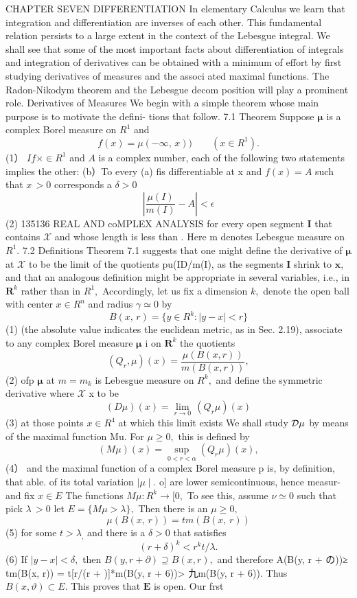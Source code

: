 CHAPTER SEVEN DIFFERENTIATION In elementary Calculus we learn that integration and differentiation are inverses of each other. This fundamental relation persists to a large extent in the context of the Lebesgue integral. We shall see that some of the most important facts about differentiation of integrals and integration of derivatives can be obtained with a minimum of effort by first studying derivatives of measures and the associ ated maximal functions. The Radon-Nikodym theorem and the Lebesgue decom position will play a prominent role. Derivatives of Measures We begin with a simple theorem whose main purpose is to motivate the defini- tions that follow. 7.1 Theorem Suppose $\boldsymbol{\mu}$ is a complex Borel measure on $R^{1}$ and $$ f(x)=\mu(-\infty,\,x))\qquad(x\in R^{1}). $$ (1） $I f\times\in R^{1}$ and $\scriptstyle A$ is a complex number, each of the following two statements implies the other: (b）To every (a) fis differentiable at x and $\textstyle{f(x)=A}$ such that $\scriptstyle x\,>0$ corresponds a $\scriptstyle\delta>0$ $$ \left|\frac{\mu(I)}{m(I)}-A\right|<\epsilon $$ (2) 135136 REAL AND coMPLEX ANALYSIS for every open segment ${\mathbf I}$ that contains $\scriptstyle{\mathcal{X}}$ and whose length is less than . Here m denotes Lebesgue measure on $R^{1}.$ 7.2 Definitions Theorem 7.1 suggests that one might define the derivative of ${\boldsymbol{\mu}}$ at $\scriptstyle{\mathcal{X}}$ to be the limit of the quotients pu(ID/m(I), as the segments ${\mathbf I}$ shrink to ${\boldsymbol{x}},$ and that an analogous definition might be appropriate in several variables, i.e., in ${\boldsymbol{R}}^{k}$ rather than in $R^{1},$ Accordingly, let us fix a dimension $k,$ denote the open ball with center $x\in R^{n}$ and radius $\scriptstyle\gamma\simeq0$ by $$ B(x,\,r)=\{y\in R^{k}\colon|y-x|<r\} $$ (1) (the absolute value indicates the euclidean metric, as in Sec. 2.19), associate to any complex Borel measure ${\boldsymbol{\mu}}$ i on ${\boldsymbol{R}}^{k}$ the quotients $$ (Q_{r},\mu)(x)={\frac{\mu(B(x,r))}{m(B(x,r))}}, $$ (2) ofp ${\boldsymbol{\mu}}$ at $m=m_{k}$ is Lebesgue measure on $R^{k},$ and define the symmetric derivative where $\scriptstyle{\mathcal{X}}$ x to be $$ (D\mu)(x)=\operatorname*{lim}_{r\to0}\,(Q_{r}\mu)(x) $$ (3) at those points $x\in R^{4}$ at which this limit exists We shall study ${\cal{D}}\mu$ by means of the maximal function Mu. For $\mu\geq0,$ this is defined by $$ (M\mu)(x)=\operatorname*{sup}_{0<r<\alpha}(Q_{r}\mu)(x), $$ (4） and the maximal function of a complex Borel measure p is, by definition, that able. of its total variation $\mid\mu\mid.$ o] are lower semicontinuous, hence measur- and fix $x\in E$ The functions $M\mu\colon R^{k}\to[0,$ To see this, assume $\scriptstyle\nu\simeq0$ such that pick $\scriptstyle\lambda\,>0$ let $E=\{M\mu>\lambda\},$ Then there is an $\mu\geq0,$ $$ \mu(B(x,\,r))=t m(B(x,\,r)) $$ (5) for some $t>\lambda_{\mathrm{{,}}}$ and there is a $\scriptstyle\delta>0$ that satisfies $$ (r+\delta)^{k}<r^{k}t/\lambda. $$ (6) If $|y-x|<\delta,$ then $B(y,r+\partial)\supseteq B(x,r),$ and therefore A(B(y, r + の))≥ tm(B(x, r)) = t[r/(r + )]*m(B(y, r + 6))> 九m(B(y, r + 6)). Thus $B(x,\vartheta)\subset E.$ This proves that $\boldsymbol{E}$ is open. Our frst 